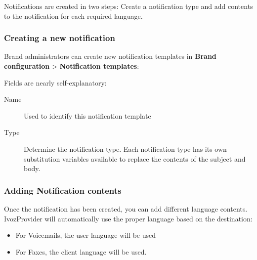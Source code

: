 \documentclass[letterpaper,10pt,english]{sphinxmanual}
\begin{document}
Notifications are created in two steps: Create a notification type and add contents to the notification for each
required language.


\subsubsection{Creating a new notification}
\label{administration_portal/brand/settings/notification_templates:creating-a-new-notification}
Brand administrators can create new notification templates in \textbf{Brand configuration} \textgreater{} \textbf{Notification templates}:

Fields are nearly self-explanatory:
\begin{description}
\item[{Name}] \leavevmode{}\label{administration_portal/brand/settings/notification_templates:term-name}
Used to identify this notification template

\item[{Type}] \leavevmode{}\label{administration_portal/brand/settings/notification_templates:term-type}
Determine the notification type. Each notification type has its own substitution variables available to replace
the contents of the subject and body.

\end{description}


\subsubsection{Adding Notification contents}
\label{administration_portal/brand/settings/notification_templates:adding-notification-contents}
Once the notification has been created, you can add different language contents. IvozProvider will automatically use
the proper language based on the destination:
\begin{itemize}
\item {} 
For Voicemails, the user language will be used

\item {} 
For Faxes, the client language will be used.

\end{itemize}
\end{document}
